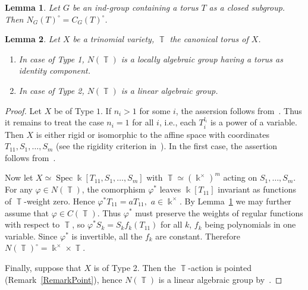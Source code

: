 \documentclass[10pt,a4paper]{amsart}
\newtheorem{lemma}{Lemma}
\DeclareMathOperator{\Spec}{Spec}
\DeclareMathOperator{\TT}{\mathbb T}
\newcommand{\kk}{\Bbbk}
\begin{document}
\begin{lemma}\label{LemmaHumphreys}
    Let $G$ be an ind-group containing a torus $T$ as a closed subgroup. Then $N_G(T)^\circ = C_G(T)^\circ$.
\end{lemma}

\begin{lemma}\label{Trinomial-N-Lemma}
    Let $X$ be a trinomial variety, $\TT$ the canonical torus of $X$.
    \begin{enumerate}
        \item[\emph{(i)}] In case of Type 1, $N(\TT)$ is a locally algebraic group having a torus as identity component.
        \item[\emph{(ii)}] In case of Type 2, $N(\TT)$ is a linear algebraic group.
    \end{enumerate} 
\end{lemma}

\begin{proof}
    Let $X$ be of Type $1$. %
    If $n_i>1$ for some $i$, the assersion follows from~\cite[Lemma~6.2 and Corollary~3.8]{BorG}. %
    Thus it remains to treat the case $n_i=1$ for all $i$, i.e., each $T_{i}^{l_i}$ is a power of a variable. Then $X$ is either rigid or isomorphic to the affine space with coordinates $T_{11}, S_1,\ldots, S_m$ (see the rigidity criterion in~\cite{EGS}). In the first case, the assertion follows from~\cite[Proposition~6.3]{BorG}. 
    
    Now let $X\simeq \Spec \kk[T_{11}, S_1,\ldots, S_m]$ with $\TT\simeq (\kk^\times)^m$ acting on $S_1,\ldots, S_m$.  For any $\varphi\in N(\TT)$, the comorphism $\varphi^*$ leaves $\kk[T_{11}]$ invariant as functions of $\TT$-weight zero. Hence $\varphi^*T_{11}=aT_{11},$ $a\in\kk^\times$. By Lemma~\ref{LemmaHumphreys} we may further assume that $\varphi\in C(\TT)$. Thus $\varphi^*$ must preserve the weights of regular functions with respect to $\TT$, so $\varphi^*S_k=S_kf_k(T_{11})$ for all $k$, $f_k$ being polynomials in one variable. Since $\varphi^*$ is invertible, all the $f_k$ are constant. Therefore $N(\TT)^\circ= \kk^\times\times\TT$. 

    Finally, suppose that $X$ is of Type 2. Then the $\TT$-action is pointed (Remark~\ref{RemarkPoint}), hence $N(\TT)$ is a linear algebraic group by~\cite[Proposition~2.2]{AHHL}. 
\end{proof}
\end{document}
